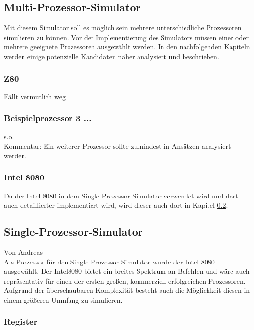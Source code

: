 \documentclass[12pt]{article}
\begin{document}
\newpage

\subsection{Multi-Prozessor-Simulator}
Mit diesem Simulator soll es möglich sein mehrere unterschiedliche Prozessoren simulieren zu können. Vor der Implementierung des Simulators müssen einer oder mehrere geeignete Prozessoren ausgewählt werden. In den nachfolgenden Kapiteln werden einige potenzielle Kandidaten näher analysiert und beschrieben.



\subsubsection{Z80}
Fällt vermutlich weg

\subsubsection{Beispielprozessor 3 ...}
s.o.\\
Kommentar: Ein weiterer Prozessor sollte zumindest in Ansätzen analysiert werden.

\subsubsection{Intel 8080}
Da der Intel 8080 in dem Single-Prozessor-Simulator verwendet wird und dort auch detaillierter implementiert wird, wird dieser auch dort in Kapitel \ref{SPS}.


\newpage

\subsection{Single-Prozessor-Simulator}
\label{SPS} 
Von Andreas\\ 

\noindent
Als Prozessor für den Single-Prozessor-Simulator wurde der Intel 8080 ausgewählt. Der Intel8080 bietet ein breites Spektrum an Befehlen und wäre auch repräsentativ für einen der ersten großen, kommerziell erfolgreichen Prozessoren. Aufgrund der überschaubaren Komplexität besteht auch die Möglichkeit diesen in einem größeren Unmfang zu simulieren.

\subsubsection{Register}
\label{RegisterSection}
\end{document}
